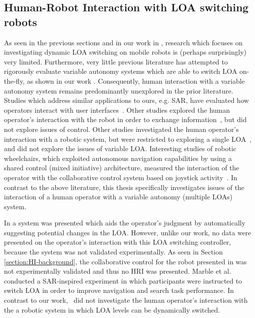 \documentclass[a4paper,12pt,oneside,openright]{bhamthesis}
\begin{document}
\subsection{Human-Robot Interaction with LOA switching robots}\label{section:HRI_LOA_switch}
As seen in the previous sections and in our work in \cite{Chiou2015}, research which focuses on investigating dynamic LOA switching on mobile robots is (perhaps surprisingly) very limited. Furthermore, very little previous literature has attempted to rigorously evaluate variable autonomy systems which are able to switch LOA on-the-fly, as shown in our work \cite{Chiou2016}. Consequently, human interaction with a variable autonomy system remains predominantly unexplored in the prior literature. Studies which address similar applications to ours, e.g. SAR, have evaluated how operators interact with user interfaces~\cite{Yanco2004,Baker2004}. Other studies explored the human operator's interaction with the robot in order to exchange information~\cite{Fong2003}, but did not explore issues of control. Other studies investigated the human operator's interaction with a robotic system, but were restricted to exploring a single LOA~\cite{Bruemmer2005}, and did not explore the issues of variable LOA. Interesting studies of robotic wheelchairs, which exploited autonomous navigation capabilities by using a shared control (mixed initiative) architecture, measured the interaction of the operator with the collaborative control system based on joystick activity~\cite{Carlson2008}. In contrast to the above literature, this thesis specifically investigates issues of the interaction of a human operator with a variable autonomy (multiple LOAs) system.

In \cite{Baker2004b} a system was presented which aids the operator's judgment by automatically suggesting potential changes in the LOA. However, unlike our work, no data were presented on the operator's interaction with this LOA switching controller, because the system was not validated experimentally. As seen in Section \ref{section:HI-background}, the collaborative control for the robot presented in \cite{Ibanez-Guzman2004} was not experimentally validated and thus no HRI was presented. Marble et al.~\cite{Marble2004} conducted a SAR-inspired experiment in which participants were instructed to switch LOA in order to improve navigation and search task performance. In contrast to our work,~\cite{Marble2004} did not investigate the human operator's interaction with the a robotic system in which LOA levels can be dynamically switched. 
\end{document}
